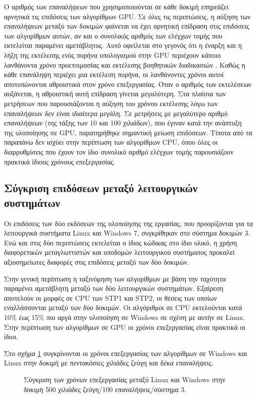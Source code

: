 Ο αριθμός των επαναλήψεων που χρησιμοποιούνται σε κάθε δοκιμή επηρεάζει αρνητικά τις επιδόσεις των αλγορίθμων GPU. Σε όλες τις περιπτώσεις, η αύξηση των επαναλήψεων μεταξύ των δοκιμών φαίνεται να έχει αρνητική επίδραση στις επιδόσεις των αλγορίθμων αυτών, αν και ο συνολικός αριθμός των ελέγχων τομής που εκτελείται παραμένει αμετάβλητος. Αυτό οφείλεται στο γεγονός ότι η έναρξη και η λήξη της εκτέλεσης ενός πυρήνα υπολογισμού στην GPU περιέχουν κάποιο λανθάνοντα χρόνο προετοιμασίας και εκτέλεσης βοηθητικών διαδικασιών \cite{ATIOpenCL}. Καθώς η κάθε επανάληψη περιέχει μια εκτέλεση πυρήνα, οι λανθάνοντες χρόνοι αυτοί αποτυπώνονται αθροιστικά στον χρόνο επεξεργασίας. Όταν ο αριθμός των εκτελέσεων αυξάνεται, η αθροιστική αυτή επίδραση  γίνεται μεγαλύτερη. Στα πλαίσια των μετρήσεων που παρουσιάζονται η αύξηση του χρόνου εκτέλεσης λόγω των επαναλήψεων δεν είναι ιδιαίτερα μεγάλη. Σε μετρήσεις με μεγαλύτερο αριθμό επαναλήψεων (της τάξης των 10 και 100 χιλιάδων), που έγιναν κατά την ανάπτυξη της υλοποίησης σε GPU, 
παρατηρήθηκε σημαντική μείωση επιδόσεων. Τίποτα από τα παραπάνω δεν ισχύει στην περίπτωση των αλγορίθμων CPU, όπου όλες οι διαρρυθμίσεις που έχουν τον ίδιο συνολικό αριθμό ελέγχων τομής παρουσιάζουν πρακτικά ίδιους χρόνους επεξεργασίας.

\subsection{Σύγκριση επιδόσεων μεταξύ λειτουργικών συστημάτων}
\noindent Οι επιδόσεις των δύο εκδόσεων της υλοποίησης της εργασίας, που προορίζονται για τα λειτουργικά συστήματα Linux και Windows 7, συγκρίθηκαν στο σύστημα δοκιμών 3. Ενώ και στις δύο περιπτώσεις εκτελείται ο ίδιος κώδικας στο ίδιο υλικό, η χρήση διαφορετικών μεταγλωττιστών και υποδομών λειτουργικού συστήματος προκαλεί αξιοσημείωτες διαφορές στις επιδόσεις μεταξύ των δύο δοκιμών.

Στην γενική περίπτωση η ταξινόμηση των αλγορίθμων με βάση την ταχύτητα παραμένει αμετάβλητη μεταξύ των δύο λειτουργικών συστημάτων. Εξαίρεση αποτελούν οι μορφές σε CPU των STP1 και STP2, οι θέσεις των οποίων εναλλάσσονται μεταξύ των δύο δοκιμών. Οι αλγόριθμοι σε CPU εκτελούνται κατά 10\% έως 15\% πιο αργά στην υλοποίηση σε Windows σε σχέση με αυτήν σε Linux. Στην περίπτωση των αλγορίθμων σε GPU οι χρόνοι επεξεργασίας είναι πρακτικά οι ίδιοι.

Στο σχήμα \ref{gpuoscomp} συγκρίνονται οι χρόνοι επεξεργασίας των αλγορίθμων σε Windows και Linux στην δοκιμή με πεντακόσιες χιλιάδες ζεύγη και δέκα επαναλήψεις. 

\begin{figure}[h!]
\begin{center}
\scalebox{0.9}{

}
\scalebox{0.9}{

}
\end{center}
\caption{Σύγκριση των χρόνων επεξεργασίας μεταξύ Linux και Windows στην δοκιμή 500 χιλιάδες ζεύγη/100 επαναλήψεις/σύστημα 3.}
\label{gpuoscomp}
\end{figure}

\UndefineShortVerb{\!}